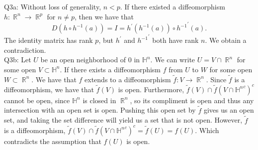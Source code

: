 \documentclass[letterpaper]{article}
\DeclareMathOperator{\R}{\mathbb{R}}
\begin{document}
 \noindent Q3a: Without loss of generality, $n<p$. If there existed a diffeomorphism $h: \R^n \to \R^p$ for $n \neq p$, then we have that $$D(h \circ h^{-1}(a)) = I = h^\prime(h^{-1}(a))\circ {h^{-1}}^\prime(a).$$
The identity matrix has rank $p$, but $h^\prime$ and ${h^{-1}}^\prime $ both have rank $n$. We obtain a contradiction.
\newline \\ Q3b: Let $U $ be an open neighborhood of $0$ in $\mathbb{H}^n$. We can write $U = V \cap \R^n$ for some open $V \subset \mathbb{H}^n$. 
If there exists a diffeomorphism $f$ from $U$ to $W$ for some open $W\subset \R^n$. 
We have that $f$ extends to a diffeomorphism $\tilde{f}: V \to \R^n$. Since $\tilde{f}$ is a diffeomorphism, 
we have that $\tilde{f}(V) $ is open. Furthermore, $\tilde{f}(V) \cap \tilde{f}(V \cap {\mathbb{H}^n}^c)^c$ cannot be open, since $\mathbb{H}^n$ is closed in $\R^n$, so its compliment is open and thus any 
intersection with an open set is open. Pushing this open set by $\tilde{f}$ gives us an open set, and taking the set difference will yield us a set that is not open. 
However, $\tilde{f}$ is a diffeomorphism, $\tilde{f}(V) \cap \tilde{f}(V \cap {\mathbb{H}^n}^c)^c = \tilde{f}(U) = f(U)$. Which contradicts the assumption that $f(U)$ is open. 
\end{document}
